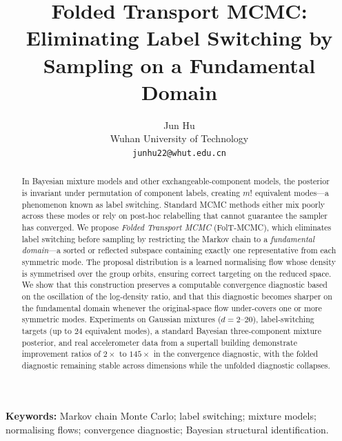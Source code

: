 \documentclass[a4paper,12pt]{article}
\title{Folded Transport MCMC: Eliminating Label Switching
  by Sampling on a Fundamental Domain}
\author{Jun Hu \\
  {\small Wuhan University of Technology} \\
  {\small \texttt{junhu22@whut.edu.cn}}}
\date{}
\theoremstyle{definition}
\theoremstyle{remark}
\begin{document}
\maketitle

\begin{abstract}
In Bayesian mixture models and other exchangeable-component
models, the posterior is invariant under permutation of
component labels, creating $m!$ equivalent modes---a
phenomenon known as label switching.  Standard MCMC methods
either mix poorly across these modes or rely on post-hoc
relabelling that cannot guarantee the sampler has converged.
We propose \emph{Folded Transport MCMC} (FolT-MCMC), which
eliminates label switching before sampling by restricting the
Markov chain to a \emph{fundamental domain}---a sorted or
reflected subspace containing exactly one representative from
each symmetric mode.  The proposal distribution is a learned
normalising flow whose density is symmetrised over the group
orbits, ensuring correct targeting on the reduced space.
We show that this construction preserves a computable
convergence diagnostic based on the oscillation of the
log-density ratio, and that this diagnostic becomes sharper on the fundamental
domain whenever the original-space flow under-covers one or
more symmetric modes.
Experiments on Gaussian mixtures ($d = 2$--$20$),
label-switching targets (up to $24$ equivalent modes), a
standard Bayesian three-component mixture posterior, and real
accelerometer data from a supertall building demonstrate
improvement ratios of $2\times$ to $145\times$ in the
convergence diagnostic, with the folded diagnostic remaining
stable across dimensions while the unfolded diagnostic
collapses.
\end{abstract}

\noindent
\textbf{Keywords:}
Markov chain Monte Carlo; label switching; mixture models;
normalising flows; convergence diagnostic;
Bayesian structural identification.

\bigskip











\newpage

\end{document}
